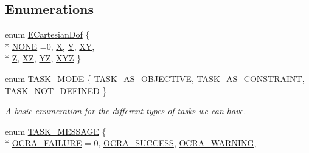 \subsection*{Enumerations}
\begin{DoxyCompactItemize}
\item 
enum \hyperlink{namespaceocra_a436781c7059a0f76027df1c652126260}{E\+Cartesian\+Dof} \{ \\*
\hyperlink{namespaceocra_a436781c7059a0f76027df1c652126260a456e873fdd3f4c086fe423ad233392c4}{N\+O\+NE} =0, 
\hyperlink{namespaceocra_a436781c7059a0f76027df1c652126260a53f3cfeeb322946db40cd86dfebfb237}{X}, 
\hyperlink{namespaceocra_a436781c7059a0f76027df1c652126260a3f012261aad5ddc1adbe90406d2dd388}{Y}, 
\hyperlink{namespaceocra_a436781c7059a0f76027df1c652126260a04d12417315a0a1b02d6abb07b9ba4ea}{XY}, 
\\*
\hyperlink{namespaceocra_a436781c7059a0f76027df1c652126260a8f46999eafdd97465edef45c5353f8f0}{Z}, 
\hyperlink{namespaceocra_a436781c7059a0f76027df1c652126260a76215fbf855151f481cfad29d6c62438}{XZ}, 
\hyperlink{namespaceocra_a436781c7059a0f76027df1c652126260a70f8ab0a8fae1a50de0a2c4250c2a85a}{YZ}, 
\hyperlink{namespaceocra_a436781c7059a0f76027df1c652126260ac391bb1035f39278511d424f00f5e3f6}{X\+YZ}
 \}
\item 
enum \hyperlink{namespaceocra_a2ed783528071ed7ee7a57d923637595f}{T\+A\+S\+K\+\_\+\+M\+O\+DE} \{ \hyperlink{namespaceocra_a2ed783528071ed7ee7a57d923637595fa086654d2e2cafe228fdcc540c5fb253f}{T\+A\+S\+K\+\_\+\+A\+S\+\_\+\+O\+B\+J\+E\+C\+T\+I\+VE}, 
\hyperlink{namespaceocra_a2ed783528071ed7ee7a57d923637595facc8c343cec041cea691138acda51cfc7}{T\+A\+S\+K\+\_\+\+A\+S\+\_\+\+C\+O\+N\+S\+T\+R\+A\+I\+NT}, 
\hyperlink{namespaceocra_a2ed783528071ed7ee7a57d923637595fa316a03f6aa426232839267753d019c5e}{T\+A\+S\+K\+\_\+\+N\+O\+T\+\_\+\+D\+E\+F\+I\+N\+ED}
 \}\begin{DoxyCompactList}\small\item\em A basic enumeration for the different types of tasks we can have. \end{DoxyCompactList}
\item 
enum \hyperlink{namespaceocra_ae51761f3980546f5ee4cbc6ebe4216dd}{T\+A\+S\+K\+\_\+\+M\+E\+S\+S\+A\+GE} \{ \\*
\hyperlink{namespaceocra_ae51761f3980546f5ee4cbc6ebe4216ddaa9cb33f64a24c52cd191bdaa2634c341}{O\+C\+R\+A\+\_\+\+F\+A\+I\+L\+U\+RE} = 0, 
\hyperlink{namespaceocra_ae51761f3980546f5ee4cbc6ebe4216dda50a83b446115e623dd81f698e32f30f4}{O\+C\+R\+A\+\_\+\+S\+U\+C\+C\+E\+SS}, 
\hyperlink{namespaceocra_ae51761f3980546f5ee4cbc6ebe4216dda187e77df0298e28d4a41bac1b2803f1a}{O\+C\+R\+A\+\_\+\+W\+A\+R\+N\+I\+NG}, 

\end{DoxyCompactItemize}
